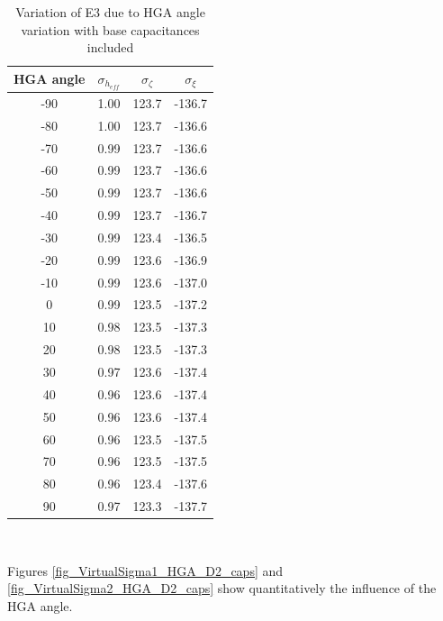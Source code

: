 \documentclass[a4paper,14pt]{extbook}
\begin{document}
\begin{table}
\centering
\caption{Variation of E3 due to HGA angle variation with base capacitances included}\label{tab_e3_var}
\begin{tabular}{|c|c|c|c|}
  \hline

HGA angle & $\sigma_{h_{eff}}$ & $\sigma_{\zeta}$ & $\sigma_{\xi}$ \\
\hline
-90 & 1.00 & 123.7 & -136.7 \\
-80 & 1.00 & 123.7 & -136.6\\
-70 & 0.99 & 123.7 & -136.6\\
-60 & 0.99 & 123.7 & -136.6\\
-50 & 0.99 & 123.7 & -136.6\\
-40 & 0.99 & 123.7 & -136.7\\
-30 & 0.99 & 123.4 & -136.5\\
-20 & 0.99 & 123.6 & -136.9\\
-10 & 0.99 & 123.6 & -137.0\\
0 & 0.99 & 123.5 &  -137.2\\
10 & 0.98 & 123.5 & -137.3\\
20 & 0.98 & 123.5 & -137.3\\
30 & 0.97 & 123.6 & -137.4\\
40 & 0.96 & 123.6 & -137.4 \\
50 & 0.96 & 123.6 & -137.4\\
60 & 0.96 & 123.5 & -137.5 \\
70 & 0.96 & 123.5 & -137.5 \\
80 & 0.96 & 123.4 & -137.6 \\
90 & 0.97 & 123.3 & -137.7 \\
\hline\end{tabular}\\
\end{table}

Figures \ref{fig_VirtualSigma1_HGA_D2_caps} and \ref{fig_VirtualSigma2_HGA_D2_caps} show quantitatively the influence of the HGA angle.
\end{document}
